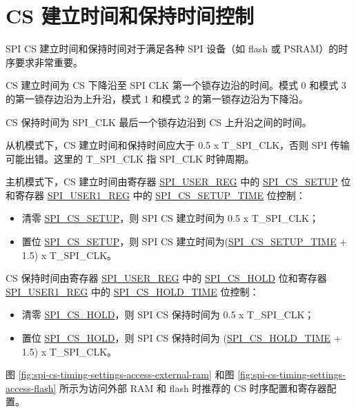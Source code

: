 \documentclass[main\_\_CN.tex]{subfiles}
\begin{document}
\section{CS 建立时间和保持时间控制}\label{sec:spi-cs-setup-hold-time-ctrl}

SPI CS 建立时间和保持时间对于满足各种 SPI 设备（如 flash 或 PSRAM）的时序要求非常重要。

CS 建立时间为 CS 下降沿至 SPI CLK 第一个锁存边沿的时间。模式 0 和模式 3 的第一锁存边沿为上升沿，模式 1 和模式 2 的第一锁存边沿为下降沿。

CS 保持时间为 SPI\_CLK 最后一个锁存边沿到 CS 上升沿之间的时间。

从机模式下，CS 建立时间和保持时间应大于 0.5 x T\_SPI\_CLK，否则 SPI 传输可能出错。这里的 T\_SPI\_CLK 指 SPI\_CLK 时钟周期。

主机模式下，CS 建立时间由寄存器 \hyperref[regdesc:SPIUSERREG]{SPI\_USER\_REG} 中的 \hyperref[fielddesc:SPICSSETUP]{SPI\_CS\_SETUP} 位和寄存器 \hyperref[regdesc:SPIUSER1REG]{SPI\_USER1\_REG} 中的 \hyperref[fielddesc:SPICSSETUPTIME]{SPI\_CS\_SETUP\_TIME} 位控制：
    \begin{itemize}
        \item 清零 \hyperref[fielddesc:SPICSSETUP]{SPI\_CS\_SETUP}，则 SPI CS 建立时间为 0.5 x T\_SPI\_CLK；
        \item 置位 \hyperref[fielddesc:SPICSSETUP]{SPI\_CS\_SETUP}，则 SPI CS 建立时间为(\hyperref[fielddesc:SPICSSETUPTIME]{SPI\_CS\_SETUP\_TIME} + 1.5) x T\_SPI\_CLK。
    \end{itemize}

CS 保持时间由寄存器 \hyperref[regdesc:SPIUSERREG]{SPI\_USER\_REG} 中的 \hyperref[fielddesc:SPICSHOLD]{SPI\_CS\_HOLD} 位和寄存器 \hyperref[regdesc:SPIUSER1REG]{SPI\_USER1\_REG} 中的 \hyperref[fielddesc:SPICSHOLDTIME]{SPI\_CS\_HOLD\_TIME} 位控制：
    \begin{itemize}
        \item 清零 \hyperref[fielddesc:SPICSHOLD]{SPI\_CS\_HOLD}，则 SPI CS 保持时间为 0.5 x T\_SPI\_CLK；
        \item 置位 \hyperref[fielddesc:SPICSHOLD]{SPI\_CS\_HOLD}，则 SPI CS 保持时间为 (\hyperref[fielddesc:SPICSHOLDTIME]{SPI\_CS\_HOLD\_TIME} + 1.5) x T\_SPI\_CLK。
    \end{itemize}

图 \ref{fig:spi-cs-timing-settings-access-external-ram} 和图 \ref{fig:spi-cs-timing-settings-access-flash} 所示为访问外部 RAM 和 flash 时推荐的 CS 时序配置和寄存器配置。
\end{document}
